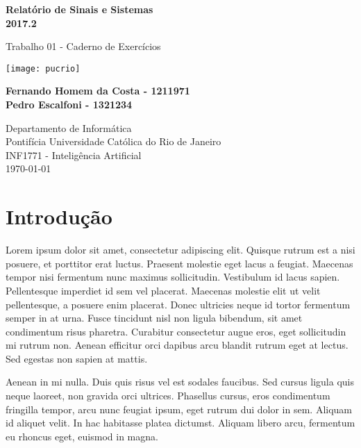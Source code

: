 \documentclass[12pt, a4paper]{article}
\begin{document}
\begin{titlepage}
	\begin{center}
		\vspace*{1cm}

		\Huge
		\textbf{Relatório de Sinais e Sistemas}\\
		\Large
		\textbf{2017.2}

		\vspace{0.5cm}
		\Large
		Trabalho 01 - Caderno de Exercícios

		\vspace{1.5cm}

		\texttt{[image: pucrio]}

		\vspace{1.5cm}

		\normalsize
		\textbf{Fernando Homem da Costa - 1211971}\\
		\textbf{Pedro Escalfoni - 1321234}

		\vfill

		\Large
		Departamento de Informática\\
		Pontifícia Universidade Católica do Rio de Janeiro\\
		INF1771 - Inteligência Artificial\\
		\today

	\end{center}
\end{titlepage}

\tableofcontents

\newpage

\section{Introdução}
Lorem ipsum dolor sit amet, consectetur adipiscing elit. Quisque rutrum est a nisi posuere, et porttitor erat luctus. Praesent molestie eget lacus a feugiat. Maecenas tempor nisi fermentum nunc maximus sollicitudin. Vestibulum id lacus sapien. Pellentesque imperdiet id sem vel placerat. Maecenas molestie elit ut velit pellentesque, a posuere enim placerat. Donec ultricies neque id tortor fermentum semper in at urna. Fusce tincidunt nisl non ligula bibendum, sit amet condimentum risus pharetra. Curabitur consectetur augue eros, eget sollicitudin mi rutrum non. Aenean efficitur orci dapibus arcu blandit rutrum eget at lectus. Sed egestas non sapien at mattis.

Aenean in mi nulla. Duis quis risus vel est sodales faucibus. Sed cursus ligula quis neque laoreet, non gravida orci ultrices. Phasellus cursus, eros condimentum fringilla tempor, arcu nunc feugiat ipsum, eget rutrum dui dolor in sem. Aliquam id aliquet velit. In hac habitasse platea dictumst. Aliquam libero arcu, fermentum eu rhoncus eget, euismod in magna.
\end{document}
